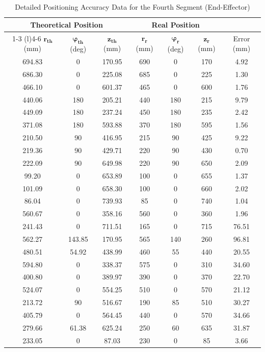 \documentclass[conference]{IEEEtran}
\begin{document}
\begin{table}[t]
\captionsetup{skip=10pt}
\centering

\caption{Detailed Positioning Accuracy Data for the Fourth Segment (End-Effector)}
\label{tab:segment4_error_data} %

\begin{tabular}{@{}ccccccc@{}}
\toprule
\multicolumn{3}{c}{Theoretical Position} & \multicolumn{3}{c}{Real Position} & \\
\cmidrule(r){1-3} \cmidrule(l){4-6}
$\boldsymbol{r_{th}}$ (mm) & $\boldsymbol{\varphi_{th}}$ (deg) & $\boldsymbol{z_{th}}$ (mm) & $\boldsymbol{r_{r}}$ (mm) & $\boldsymbol{\varphi_{r}}$ (deg) & $\boldsymbol{z_{r}}$ (mm) & Error (mm) \\
\midrule
694.83 & 0      & 170.95 & 690 & 0   & 170 & 4.92 \\
686.30 & 0      & 225.08 & 685 & 0   & 225 & 1.30 \\
466.10 & 0      & 601.37 & 465 & 0   & 600 & 1.76 \\
440.06 & 180    & 205.21 & 440 & 180 & 215 & 9.79 \\
449.09 & 180    & 237.24 & 450 & 180 & 235 & 2.42 \\
371.08 & 180    & 593.88 & 370 & 180 & 595 & 1.56 \\
210.50 & 90     & 416.95 & 215 & 90  & 425 & 9.22 \\
219.36 & 90     & 429.71 & 220 & 90  & 430 & 0.70 \\
222.09 & 90     & 649.98 & 220 & 90  & 650 & 2.09 \\
99.20  & 0      & 653.89 & 100 & 0   & 655 & 1.37 \\
101.09 & 0      & 658.30 & 100 & 0   & 660 & 2.02 \\
86.04  & 0      & 739.93 & 85  & 0   & 740 & 1.04 \\
560.67 & 0      & 358.16 & 560 & 0   & 360 & 1.96 \\
241.43 & 0      & 711.51 & 165 & 0   & 715 & 76.51 \\
562.27 & 143.85 & 170.95 & 565 & 140 & 260 & 96.81 \\
480.51 & 54.92  & 438.99 & 460 & 55  & 440 & 20.55 \\
594.80 & 0      & 338.37 & 575 & 0   & 310 & 34.60 \\
400.80 & 0      & 389.97 & 390 & 0   & 370 & 22.70 \\
524.07 & 0      & 554.25 & 510 & 0   & 570 & 21.12 \\
213.72 & 90     & 516.67 & 190 & 85  & 510 & 30.27 \\
405.79 & 0      & 564.45 & 440 & 0   & 570 & 34.66 \\
279.66 & 61.38  & 625.24 & 250 & 60  & 635 & 31.87 \\
233.05 & 0      & 87.03  & 230 & 0   & 85  & 3.66 \\
\bottomrule
\end{tabular}

\end{table}
\end{document}
